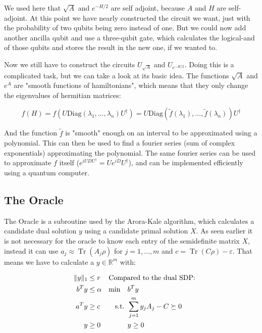 \documentclass[11pt,a4paper]{scrartcl}
\DeclareMathOperator{\Tr}{Tr}
\begin{document}
We used here that $\sqrt{A}$ and $e^{-H/2}$ are self adjoint, because $A$ and $H$ are self-adjoint. At this point we have nearly constructed the circuit we want, just with the probability of two qubits being zero instead of one. But we could now add another ancilla qubit and use a three-qubit gate, which calculates the logical-and of those qubits and stores the result in the new one, if we wanted to.

Now we still have to construct the circuits $U_{\sqrt{A}}$ and $U_{e^{-H/2}}$. Doing this is a complicated task, but we can take a look at its basic idea. The functions $\sqrt{A}$ and $e^A$ are "smooth functions of hamiltonians", which means that they only change the eigenvalues of hermitian matrices:

\begin{equation*}
f(H)=f(U \mathrm{Diag}(\lambda_1,\ldots, \lambda_n) U^\dagger)=U \mathrm{Diag}(\tilde{f}(\lambda_1),\ldots,\tilde{f}(\lambda_n))U^\dagger
\end{equation*}

And the function $\tilde{f}$ is "smooth" enough on an interval to be approximated using a polynomial. This can then be used to find a fourier series (sum of complex exponentials) approximating the polynomial. The same fourier series can be used to approximate $f$ itself ($e^{iUDU^\dagger}=Ue^{iD}U^\dagger$), and can be implemented efficiently using a quantum computer.



\subsection{The Oracle}

The Oracle is a subroutine used by the Arora-Kale algorithm, which calculates a candidate dual solution $y$ using a candidate primal solution $X$. As seen earlier it is not necessary for the oracle to know each entry of the semidefinite matrix $X$, instead it can use $a_j\approx\Tr(A_j\rho)$ for $j=1,\ldots,m$ and $c=\Tr(C\rho)-\varepsilon$. That means we have to calculate a $y\in \mathbb{R}^m$ with:

\begin{align*}
\|y\|_1&\leq r & \omit\rlap{Compared to the dual SDP:}\\
b^T y&\leq \alpha&\min \quad &b^T y\\
a^T y&\geq c& \text{s.t. } &\sum_{j=1}^m y_j A_j - C\succeq 0\\
y&\geq 0 & &y\geq 0
\end{align*}
\end{document}
